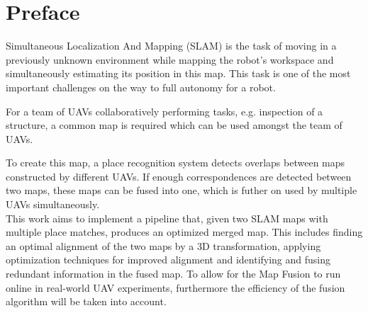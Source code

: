 \chapter*{Preface}

Simultaneous Localization And Mapping (SLAM) is the task of moving in a previously unknown environment while mapping the robot’s workspace and simultaneously estimating its position in this map. This task is one of the most important challenges on the way to full autonomy for a robot.

For a team of UAVs collaboratively performing tasks, e.g. inspection of a structure, a common map is required which can be used amongst the team of UAVs.

To create this map, a place recognition system detects overlaps between maps constructed by different UAVs. If enough correspondences are detected between two maps, these maps can be fused into one, which is futher on used by multiple UAVs simultaneously.\\

This work aims to implement a pipeline that, given two SLAM maps with multiple place matches, produces an optimized merged map. This includes finding an optimal alignment of the two maps by a 3D transformation, applying optimization techniques for improved alignment and identifying and fusing redundant information in the fused map. To allow for the Map Fusion to run online in real-world UAV experiments, furthermore the efficiency of the fusion algorithm will be taken into account.
